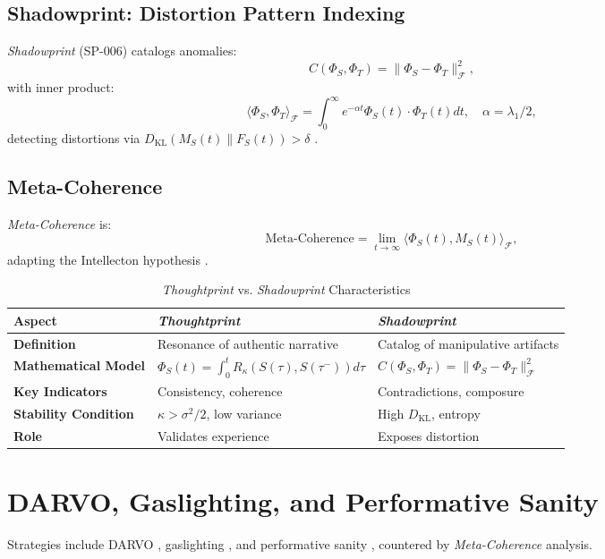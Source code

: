 \documentclass[11pt]{article}
\newcommand{\thoughtprint}{\textit{Thoughtprint}}
\newcommand{\shadowprint}{\textit{Shadowprint}}
\newcommand{\metacoherence}{\textit{Meta-Coherence}}
\begin{document}
\subsection{Shadowprint: Distortion Pattern Indexing}
\label{subsec:shadowprint}
\shadowprint{} (SP-006) catalogs anomalies:
\[
C(\Phi_S, \Phi_T) = \|\Phi_S - \Phi_T\|_\mathcal{F}^2,
\]
with inner product:
\[
\langle \Phi_S, \Phi_T \rangle_\mathcal{F} = \int_0^\infty e^{-\alpha t} \Phi_S(t) \cdot \Phi_T(t) dt, \quad \alpha = \lambda_1 / 2,
\]
detecting distortions via \(D_{\mathrm{KL}}(M_S(t) \| F_S(t)) > \delta\) \citep{havens2025b}.

\subsection{Meta-Coherence}
\label{subsec:metacoherence}
\metacoherence{} is:
\[
\text{Meta-Coherence} = \lim_{t \to \infty} \langle \Phi_S(t), M_S(t) \rangle_\mathcal{F},
\]
adapting the Intellecton hypothesis \citep{havens2025a,busemeyer2012}.

\begin{table}[htbp]
\small
\centering
\caption{\thoughtprint{} vs. \shadowprint{} Characteristics}
\begin{tabular}{p{4cm}p{4.5cm}p{4.5cm}}
\toprule
\textbf{Aspect} & \textbf{\thoughtprint{}} & \textbf{\shadowprint{}} \\
\midrule
\textbf{Definition} & Resonance of authentic narrative & Catalog of manipulative artifacts \\
\textbf{Mathematical Model} & \(\Phi_S(t) = \int_0^t R_\kappa(S(\tau), S(\tau^-)) d\tau\) & \(C(\Phi_S, \Phi_T) = \|\Phi_S - \Phi_T\|_\mathcal{F}^2\) \\
\textbf{Key Indicators} & Consistency, coherence & Contradictions, composure \\
\textbf{Stability Condition} & \(\kappa > \sigma^2/2\), low variance & High \(D_{\mathrm{KL}}\), entropy \\
\textbf{Role} & Validates experience & Exposes distortion \\
\bottomrule
\end{tabular}
\label{tab:dyad}
\end{table}

\section{DARVO, Gaslighting, and Performative Sanity}
\label{sec:distortions}
Strategies include DARVO \citep{freyd1997}, gaslighting \citep{stark2007}, and performative sanity \citep{babcock2017}, countered by \metacoherence{} analysis.
\end{document}
